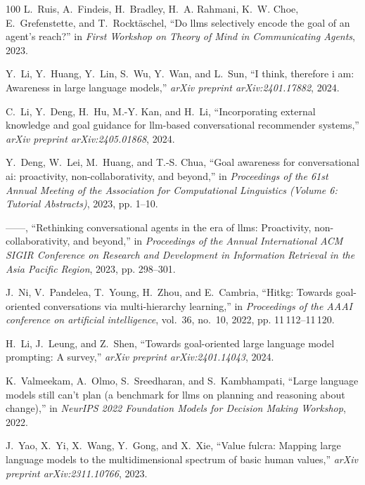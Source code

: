 \documentclass[10pt,journal,compsoc]{IEEEtran}
\begin{document}
\begin{thebibliography}{100}
	L.~Ruis, A.~Findeis, H.~Bradley, H.~A. Rahmani, K.~W. Choe, E.~Grefenstette,
	and T.~Rockt{\"a}schel, ``Do llms selectively encode the goal of an agent's
	reach?'' in \emph{First Workshop on Theory of Mind in Communicating Agents},
	2023.
	
	Y.~Li, Y.~Huang, Y.~Lin, S.~Wu, Y.~Wan, and L.~Sun, ``I think, therefore i am:
	Awareness in large language models,'' \emph{arXiv preprint arXiv:2401.17882},
	2024.
	
	C.~Li, Y.~Deng, H.~Hu, M.-Y. Kan, and H.~Li, ``Incorporating external knowledge
	and goal guidance for llm-based conversational recommender systems,''
	\emph{arXiv preprint arXiv:2405.01868}, 2024.
	
	Y.~Deng, W.~Lei, M.~Huang, and T.-S. Chua, ``Goal awareness for conversational
	ai: proactivity, non-collaborativity, and beyond,'' in \emph{Proceedings of
		the 61st Annual Meeting of the Association for Computational Linguistics
		(Volume 6: Tutorial Abstracts)}, 2023, pp. 1--10.
	
	------, ``Rethinking conversational agents in the era of llms: Proactivity,
	non-collaborativity, and beyond,'' in \emph{Proceedings of the Annual
		International ACM SIGIR Conference on Research and Development in Information
		Retrieval in the Asia Pacific Region}, 2023, pp. 298--301.
	
	J.~Ni, V.~Pandelea, T.~Young, H.~Zhou, and E.~Cambria, ``Hitkg: Towards
	goal-oriented conversations via multi-hierarchy learning,'' in
	\emph{Proceedings of the AAAI conference on artificial intelligence},
	vol.~36, no.~10, 2022, pp. 11\,112--11\,120.
	
	H.~Li, J.~Leung, and Z.~Shen, ``Towards goal-oriented large language model
	prompting: A survey,'' \emph{arXiv preprint arXiv:2401.14043}, 2024.
	
	K.~Valmeekam, A.~Olmo, S.~Sreedharan, and S.~Kambhampati, ``Large language
	models still can't plan (a benchmark for llms on planning and reasoning about
	change),'' in \emph{NeurIPS 2022 Foundation Models for Decision Making
		Workshop}, 2022.
	
	J.~Yao, X.~Yi, X.~Wang, Y.~Gong, and X.~Xie, ``Value fulcra: Mapping large
	language models to the multidimensional spectrum of basic human values,''
	\emph{arXiv preprint arXiv:2311.10766}, 2023.
	

\end{thebibliography}
\end{document}
